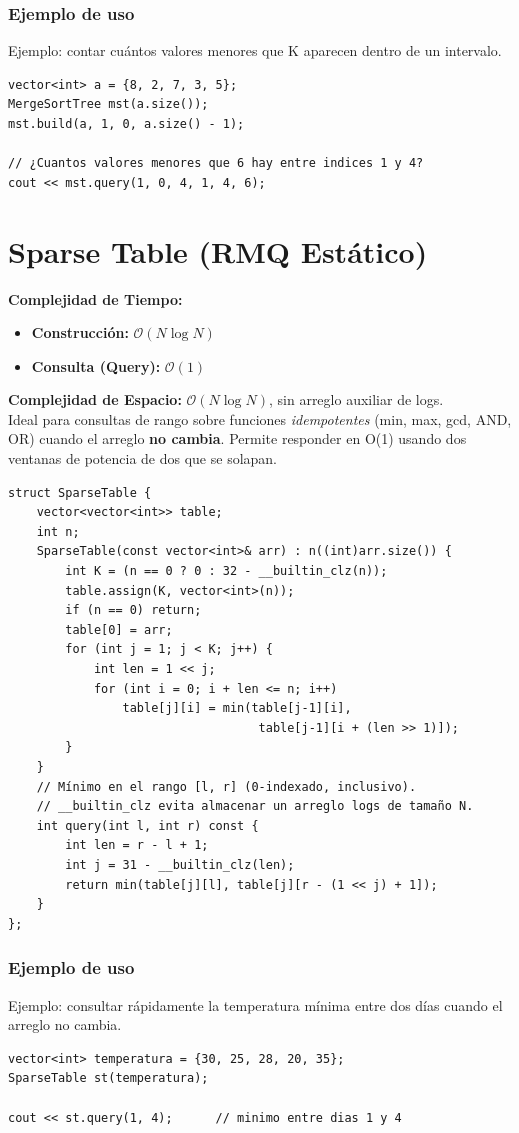 \documentclass[10pt,twocolumn,letterpaper]{report}
\begin{document}
\subsubsection*{Ejemplo de uso}
Ejemplo: contar cuántos valores menores que K aparecen dentro de un intervalo.
\begin{lstlisting}
vector<int> a = {8, 2, 7, 3, 5};
MergeSortTree mst(a.size());
mst.build(a, 1, 0, a.size() - 1);

// ¿Cuantos valores menores que 6 hay entre indices 1 y 4?
cout << mst.query(1, 0, 4, 1, 4, 6);
\end{lstlisting}

\section{Sparse Table (RMQ Estático)}
\textbf{Complejidad de Tiempo:}
\begin{itemize}
    \item \textbf{Construcción:} $\mathcal{O}(N \log N)$
    \item \textbf{Consulta (Query):} $\mathcal{O}(1)$
\end{itemize}
\textbf{Complejidad de Espacio:} $\mathcal{O}(N \log N)$, sin arreglo auxiliar de logs. \\
Ideal para consultas de rango sobre funciones \textit{idempotentes} (min, max, gcd, AND, OR) cuando el arreglo \textbf{no cambia}. Permite responder en O(1) usando dos ventanas de potencia de dos que se solapan.
\begin{lstlisting}
struct SparseTable {
    vector<vector<int>> table;
    int n;
    SparseTable(const vector<int>& arr) : n((int)arr.size()) {
        int K = (n == 0 ? 0 : 32 - __builtin_clz(n));
        table.assign(K, vector<int>(n));
        if (n == 0) return;
        table[0] = arr;
        for (int j = 1; j < K; j++) {
            int len = 1 << j;
            for (int i = 0; i + len <= n; i++)
                table[j][i] = min(table[j-1][i],
                                   table[j-1][i + (len >> 1)]);
        }
    }
    // Mínimo en el rango [l, r] (0-indexado, inclusivo).
    // __builtin_clz evita almacenar un arreglo logs de tamaño N.
    int query(int l, int r) const {
        int len = r - l + 1;
        int j = 31 - __builtin_clz(len);
        return min(table[j][l], table[j][r - (1 << j) + 1]);
    }
};
\end{lstlisting}
\subsubsection*{Ejemplo de uso}
Ejemplo: consultar rápidamente la temperatura mínima entre dos días cuando el arreglo no cambia.
\begin{lstlisting}
vector<int> temperatura = {30, 25, 28, 20, 35};
SparseTable st(temperatura);

cout << st.query(1, 4);      // minimo entre dias 1 y 4
\end{lstlisting}
\end{document}
